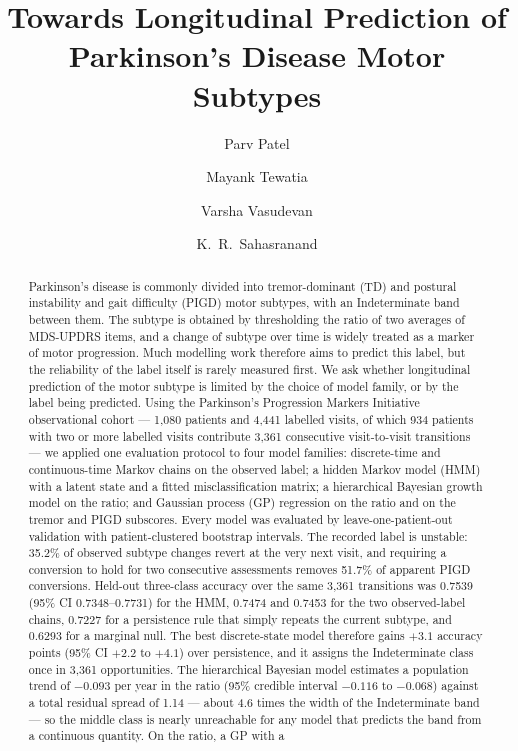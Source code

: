 \documentclass[11pt]{article}
\title{\bfseries Towards Longitudinal Prediction of\\
Parkinson's Disease Motor Subtypes}
\author[1]{Parv Patel}
\author[1]{Mayank Tewatia}
\author[2]{Varsha Vasudevan}
\author[1]{K.~R.~Sahasranand}
\affil[1]{\normalsize Indian Institute of Technology Palakkad, India}
\affil[2]{\normalsize NeuroComp}
\date{}
\begin{document}
\maketitle
\thispagestyle{fancy}

\begin{abstract}
\noindent
Parkinson's disease is commonly divided into tremor-dominant (TD) and postural
instability and gait difficulty (PIGD) motor subtypes, with an Indeterminate
band between them. The subtype is obtained by thresholding the ratio of two
averages of MDS-UPDRS items, and a change of subtype over time is widely treated
as a marker of motor progression. Much modelling work therefore aims to predict
this label, but the reliability of the label itself is rarely measured first. We
ask whether longitudinal prediction of the motor subtype is limited by the
choice of model family, or by the label being predicted. Using the Parkinson's
Progression Markers Initiative observational cohort --- 1,080 patients and 4,441
labelled visits, of which 934 patients with two or more labelled visits
contribute 3,361 consecutive visit-to-visit transitions --- we applied one
evaluation protocol to four model families: discrete-time and continuous-time
Markov chains on the observed label; a hidden Markov model (HMM) with a latent
state and a fitted misclassification matrix; a hierarchical Bayesian growth
model on the ratio; and Gaussian process (GP) regression on the ratio and on the
tremor and PIGD subscores. Every model was evaluated by leave-one-patient-out
validation with patient-clustered bootstrap intervals. The recorded label is
unstable: 35.2\% of observed subtype changes revert at the very next visit, and
requiring a conversion to hold for two consecutive assessments removes 51.7\% of
apparent PIGD conversions. Held-out three-class accuracy over the same 3,361
transitions was 0.7539 (95\% CI 0.7348--0.7731) for the HMM, 0.7474 and 0.7453
for the two observed-label chains, 0.7227 for a persistence rule that simply
repeats the current subtype, and 0.6293 for a marginal null. The best
discrete-state model therefore gains $+3.1$ accuracy points (95\% CI $+2.2$ to
$+4.1$) over persistence, and it assigns the Indeterminate class once in 3,361
opportunities. The hierarchical Bayesian model estimates a population trend of
$-0.093$ per year in the ratio (95\% credible interval $-0.116$ to $-0.068$)
against a total residual spread of 1.14 --- about 4.6 times the width of the
Indeterminate band --- so the middle class is nearly unreachable for any model
that predicts the band from a continuous quantity. On the ratio, a GP with a

\end{abstract}
\end{document}
